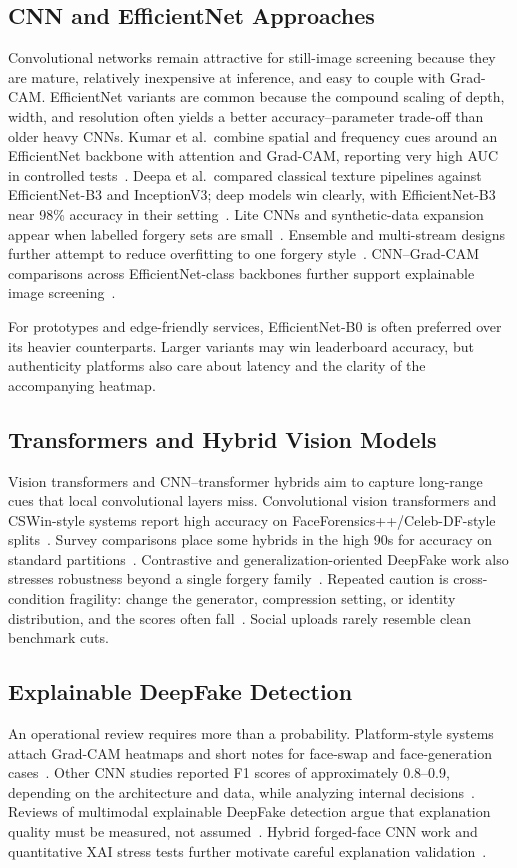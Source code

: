 \documentclass[runningheads]{llncs}
\begin{document}
\subsection{CNN and EfficientNet Approaches}
Convolutional networks remain attractive for still-image screening because they are mature, relatively inexpensive at inference, and easy to couple with Grad-CAM. EfficientNet variants are common because the compound scaling of depth, width, and resolution often yields a better accuracy--parameter trade-off than older heavy CNNs. Kumar et al.\ combine spatial and frequency cues around an EfficientNet backbone with attention and Grad-CAM, reporting very high AUC in controlled tests~\cite{r02}. Deepa et al.\ compared classical texture pipelines against EfficientNet-B3 and InceptionV3; deep models win clearly, with EfficientNet-B3 near 98\% accuracy in their setting~\cite{r04}. Lite CNNs and synthetic-data expansion appear when labelled forgery sets are small~\cite{r12}. Ensemble and multi-stream designs further attempt to reduce overfitting to one forgery style~\cite{r05,r17}. CNN--Grad-CAM comparisons across EfficientNet-class backbones further support explainable image screening~\cite{r39}.

For prototypes and edge-friendly services, EfficientNet-B0 is often preferred over its heavier counterparts. Larger variants may win leaderboard accuracy, but authenticity platforms also care about latency and the clarity of the accompanying heatmap.

\subsection{Transformers and Hybrid Vision Models}
Vision transformers and CNN--transformer hybrids aim to capture long-range cues that local convolutional layers miss. Convolutional vision transformers and CSWin-style systems report high accuracy on FaceForensics++/Celeb-DF-style splits~\cite{r10,r06}. Survey comparisons place some hybrids in the high 90s for accuracy on standard partitions~\cite{r09}. Contrastive and generalization-oriented DeepFake work also stresses robustness beyond a single forgery family~\cite{r11,r16}. Repeated caution is cross-condition fragility: change the generator, compression setting, or identity distribution, and the scores often fall~\cite{r08,r09}. Social uploads rarely resemble clean benchmark cuts.

\subsection{Explainable DeepFake Detection}
An operational review requires more than a probability. Platform-style systems attach Grad-CAM heatmaps and short notes for face-swap and face-generation cases~\cite{r07}. Other CNN studies reported F1 scores of approximately 0.8--0.9, depending on the architecture and data, while analyzing internal decisions~\cite{r13}. Reviews of multimodal explainable DeepFake detection argue that explanation quality must be measured, not assumed~\cite{r14}. Hybrid forged-face CNN work and quantitative XAI stress tests further motivate careful explanation validation~\cite{r15,r19}.
\end{document}
